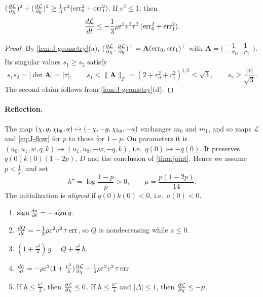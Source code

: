 \begin{lemma}
\label{lem:J-gradient}
$(\pd{\mathcal L}{\cnt})^2+(\pd{\mathcal L}{g})^2\ge\frac{1}{3}\tau^2(\mathrm{err}_0^2+\mathrm{err}_1^2)$. If $v^2\le1$, then
\[
 \ddt{\mathcal L}\le-\tfrac{1}{3}\rho\initscale^2v^2\tau^2\,(\mathrm{err}_0^2+\mathrm{err}_1^2).
\]
\end{lemma}

\begin{proof}
By \cref{lem:J-geometry}(a), $(\pd{\mathcal L}{\cnt},\pd{\mathcal L}{g})^\top=\mathbf A(\mathrm{err}_0,\mathrm{err}_1)^\top$ with $\mathbf A=\bigl(\begin{smallmatrix}-1&1\\-r_0&r_1\end{smallmatrix}\bigr)$. Its singular values $s_1\ge s_2$
satisfy
\[
 s_1s_2=|\det\mathbf A|=|\tau|,\qquad s_1\le\|\mathbf A\|_F=(2+r_0^2+r_1^2)^{1/2}\le\sqrt3,\qquad s_2\ge\frac{|\tau|}{\sqrt3} .
\]
The second claim follows from \cref{lem:J-geometry}(d).
\end{proof}

\paragraph{Reflection.} The map $(\chi,g,\chi_{\mathrm{bg}},a)\mapsto(-\chi,-g,\chi_{\mathrm{bg}},-a)$ exchanges $m_0$ and $m_1$, and so maps $\mathcal L$ and \cref{eq:J-flow} for $p$ to those
for $1-p$. On parameters it is $(u_0,u_1,w,q,k)\mapsto(u_1,u_0,-w,-q,k)$, i.e.\ $q(0)\mapsto-q(0)$. It preserves $q(0)k(0)(1-2p)$, $D$ and the
conclusion of \cref{thm:joint}. Hence we assume $p<\frac{1}{2}$, and set
\[
 h^\star=\log\frac{1-p}{p}>0,\qquad \mu=\frac{p(1-2p)}{14}.
\]
The initialization is \emph{aligned} if $q(0)k(0)<0$, i.e.\ $a(0)<0$.

\begin{lemma}
\label{lem:J-drift}
\begin{enumerate}[label=(\alph*),leftmargin=*,itemsep=2pt,topsep=3pt]
\item $\operatorname{sign}\ddt{a}=-\operatorname{sign}g$.
\item $\ddt{Q}=-\frac{1}{2}\rho\initscale^2v^2\,\tau\,\mathrm{err}$, so $Q$ is nondecreasing while $a\le0$.
\item $(1+\frac{v^2}{4})\,g=Q+\frac{v^2}{2}\,h$.
\item $\ddt{h}=-\rho\initscale^2(1+\frac{v^2}{4})\pd{\mathcal L}{\cnt}-\frac{1}{4}\rho\initscale^2v^2\,\tau\,\mathrm{err}$.
\item If $h\le\frac{h^\star}{2}$, then $\pd{\mathcal L}{\cnt}\le0$. If $h\le\frac{h^\star}{4}$ and $|\Delta|\le1$, then $\pd{\mathcal L}{\cnt}\le-\mu$.
\end{enumerate}
\end{lemma}

